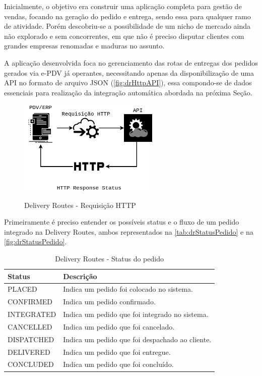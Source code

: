  Inicialmente, o objetivo era construir uma aplicação completa para gestão de vendas, focando na geração do pedido e entrega, sendo essa para qualquer ramo de atividade. Porém descobriu-se a possibilidade de um nicho de mercado ainda não explorado e sem concorrentes, em que não é preciso disputar clientes com grandes empresas renomadas e maduras no assunto.
 
 A aplicação desenvolvida foca no gerenciamento das rotas de entregas dos pedidos gerados via e-PDV já operantes, necessitando apenas da disponibilização de uma API no formato de arquivo JSON (\autoref{fig:drHttpAPI}), essa compondo-se de dados essenciais para realização da integração automática abordada na próxima Seção.
 
  \begin{figure}[H]
    \centering
    \caption{Delivery Routes - Requisição HTTP}
    \includegraphics[width=0.6\textwidth]{./dados/figuras/fig16}
    \label{fig:drHttpAPI}
\end{figure}
 
 Primeiramente é preciso entender os possíveis status e o fluxo de um pedido integrado na Delivery Routes, ambos representados na \autoref{tab:drStatusPedido} e na \autoref{fig:drStatusPedido}.
 
 \begin{table}[H]
    \centering
    \caption{Delivery Routes - Status do pedido
    \label{tab:drStatusPedido}}
\begin{tabular}{|l|l|}
\hline
\textbf{Status} & \textbf{Descrição} \\ \hline
PLACED & Indica um pedido foi colocado no sistema. \\ \hline
CONFIRMED & Indica um pedido confirmado. \\ \hline
INTEGRATED & Indica um pedido que foi integrado no sistema. \\ \hline
CANCELLED & Indica um pedido que foi cancelado. \\ \hline
DISPATCHED & Indica um pedido que foi despachado ao cliente. \\ \hline
DELIVERED & Indica um pedido que foi entregue. \\ \hline
CONCLUDED & Indica um pedido que foi concluído. \\ \hline
\end{tabular}
\end{table}
 
